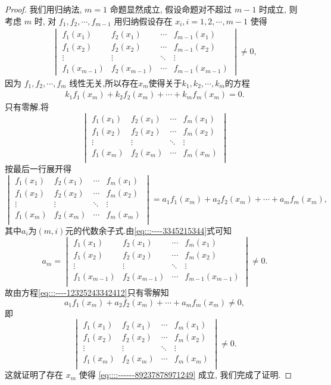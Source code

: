 \documentclass[../../main.tex]{subfiles}
\begin{document}
\begin{proof}
我们用归纳法, \( m = 1 \) 命题显然成立, 假设命题对不超过 \( m - 1 \) 时成立, 则考虑 \( m \) 时, 对 \( f_1, f_2, \cdots, f_{m - 1} \) 用归纳假设存在 \( x_i, i = 1, 2, \cdots, m - 1 \) 使得
\begin{align}\label{eq:::----3345215344}
\begin{vmatrix}
f_1(x_1) & f_2(x_1) & \cdots & f_{m - 1}(x_1) \\
f_1(x_2) & f_2(x_2) & \cdots & f_{m - 1}(x_2) \\
\vdots & \vdots & \ddots & \vdots \\
f_1(x_{m - 1}) & f_2(x_{m - 1}) & \cdots & f_{m - 1}(x_{m - 1})
\end{vmatrix} \neq 0,
\end{align}
因为 \( f_1, f_2, \cdots, f_m \) 线性无关,所以存在$x_m$使得关于$k_1,k_2,\cdots,k_m$的方程
\begin{align}\label{eq:::----12325243342412}
k_1f_1\left( x_m \right) +k_2f_2\left( x_m \right) +\cdots +k_mf_m\left( x_m \right) =0.
\end{align}
只有零解.将
\[
\begin{vmatrix}
f_1(x_1)&f_2(x_1)&\cdots&f_m(x_1)\\
f_1(x_2)&f_2(x_2)&\cdots&f_m(x_2)\\
\vdots&\vdots&\ddots&\vdots\\
f_1(x_m)&f_2(x_m)&\cdots&f_m(x_m)\\
\end{vmatrix}
\]
按最后一行展开得
\[
\begin{vmatrix}
f_1(x_1)&f_2(x_1)&\cdots&f_m(x_1)\\
f_1(x_2)&f_2(x_2)&\cdots&f_m(x_2)\\
\vdots&\vdots&\ddots&\vdots\\
f_1(x_m)&f_2(x_m)&\cdots&f_m(x_m)\\
\end{vmatrix}=a_1f_1(x_m)+a_2f_2(x_m)+\cdots+a_mf_m(x_m),
\]
其中$a_i$为$(m,i)$元的代数余子式.由\eqref{eq:::----3345215344}式可知
\[
a_m=\begin{vmatrix}
f_1(x_1)&f_2(x_1)&\cdots&f_m(x_1)\\
f_1(x_2)&f_2(x_2)&\cdots&f_m(x_2)\\
\vdots&\vdots&\ddots&\vdots\\
f_1(x_{m-1})&f_2(x_{m-1})&\cdots&f_{m-1}(x_{m-1})\\
\end{vmatrix}\ne 0.
\]
故由方程\eqref{eq:::----12325243342412}只有零解知
\[
a_1f_1(x_m)+a_2f_2(x_m)+\cdots+a_mf_m(x_m)\ne 0,
\]
即
\[
\begin{vmatrix}
f_1(x_1)&f_2(x_1)&\cdots&f_m(x_1)\\
f_1(x_2)&f_2(x_2)&\cdots&f_m(x_2)\\
\vdots&\vdots&\ddots&\vdots\\
f_1(x_m)&f_2(x_m)&\cdots&f_m(x_m)\\
\end{vmatrix}\ne 0.
\]
这就证明了存在 \( x_m \) 使得 \eqref{eq::::------89237878971249} 成立, 我们完成了证明.

\end{proof}
\end{document}
